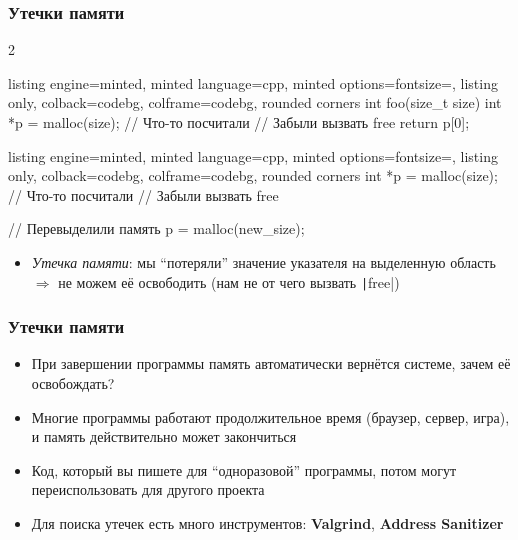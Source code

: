 \documentclass[10pt]{beamer}
\begin{document}
\begin{frame}[fragile]
\frametitle{Утечки памяти}
\begin{multicols}{2}
\begin{tcblisting}{listing engine=minted, minted language=cpp, minted options={fontsize=\scriptsize}, listing only, colback=codebg, colframe=codebg, rounded corners}
int foo(size_t size) {
  int *p = malloc(size);
  // Что-то посчитали
  // Забыли вызвать free
  return p[0];
}
\end{tcblisting}
\columnbreak
\begin{tcblisting}{listing engine=minted, minted language=cpp, minted options={fontsize=\scriptsize}, listing only, colback=codebg, colframe=codebg, rounded corners}
int *p = malloc(size);
// Что-то посчитали
// Забыли вызвать free

// Перевыделили память
p = malloc(new_size);
\end{tcblisting}
\end{multicols}
\begin{itemize}
\item \textit{Утечка памяти}: мы ``потеряли'' значение указателя на выделенную область \(\Longrightarrow\) не можем её освободить (нам не от чего вызвать \texttt|free|)
\end{itemize}
\end{frame}

\begin{frame}[fragile]
\frametitle{Утечки памяти}
\begin{itemize}
\item При завершении программы память автоматически вернётся системе, зачем её освобождать?
\pause
\item Многие программы работают продолжительное время (браузер, сервер, игра), и память действительно может закончиться
\pause
\item Код, который вы пишете для ``одноразовой'' программы, потом могут переиспользовать для другого проекта
\pause
\item Для поиска утечек есть много инструментов: \textbf{Valgrind}, \textbf{Address Sanitizer}
\end{itemize}
\end{frame}
\end{document}
